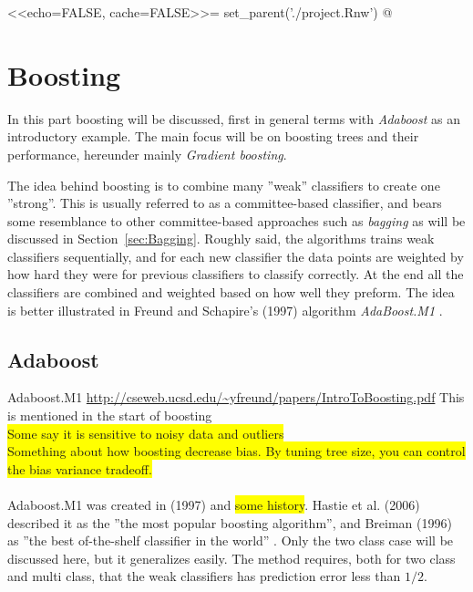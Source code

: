 <<echo=FALSE, cache=FALSE>>=
set_parent('./project.Rnw')
@
\section{Boosting}
\label{sec:Boosting}
In this part boosting will be discussed, first in general terms with \textit{Adaboost} as an introductory example. The main focus will be on boosting trees and their performance, hereunder mainly \textit{Gradient boosting}.

The idea behind boosting is to combine many ''weak'' classifiers to create one ''strong''. This is usually referred to as a committee-based classifier, and bears some resemblance to other committee-based approaches such as \textit{bagging} as will be discussed in Section~\ref{sec:Bagging}.  Roughly said, the algorithms trains weak classifiers sequentially, and for each new classifier the data points are weighted by how hard they were for previous classifiers to classify correctly. At the end all the classifiers are combined and weighted based on how well they preform. The idea is better illustrated in Freund and Schapire's (1997) algorithm \textit{AdaBoost.M1} \cite{adaboostM1}.
\subsection{Adaboost}
\label{sub:Adaboost}
Adaboost.M1 \url{http://cseweb.ucsd.edu/~yfreund/papers/IntroToBoosting.pdf} This is mentioned in the start of boosting \cite{modstat} \\
\colorbox{yellow}{Some say it is sensitive to noisy data and outliers}\\
\colorbox{yellow}{Something about how boosting decrease bias. By tuning tree size, you can control the bias variance tradeoff.}\\
\\
Adaboost.M1 was created in (1997) and \colorbox{yellow}{some history}. Hastie et al. (2006) \cite{modstat} described it as the ''the most popular boosting algorithm'', and Breiman (1996) \cite{Breiman1996} as ''the best of-the-shelf classifier in the world'' . Only the two class case will be discussed here, but it generalizes easily. The method requires, both for two class and multi class, that the weak classifiers has prediction error less than $1/2$.


